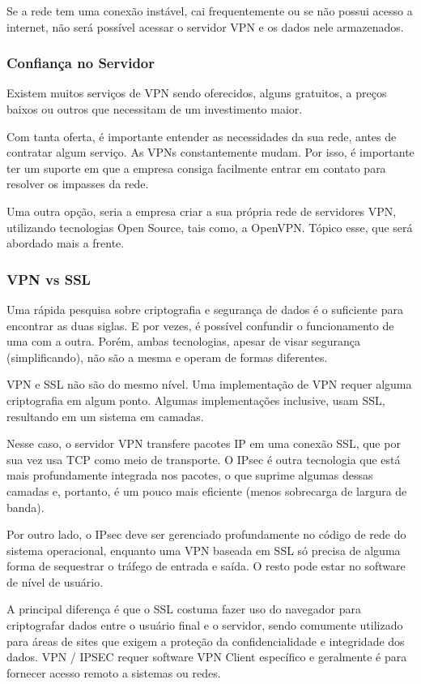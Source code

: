 \documentclass[12pt]{article}
\begin{document}
\begin{flushleft}
Se a rede tem uma conexão instável, cai frequentemente ou se não possui acesso a internet, não será possível acessar o servidor VPN e os dados nele armazenados.

\subsubsection{Confiança no Servidor}
Existem muitos serviços de VPN sendo oferecidos, alguns gratuitos, a preços baixos ou outros que necessitam de um investimento maior.

Com tanta oferta, é importante entender as necessidades da sua rede, antes de contratar algum serviço.  As VPNs constantemente mudam. Por isso, é importante ter um suporte em que a empresa consiga facilmente entrar em contato para resolver os impasses da rede.

Uma outra opção, seria a empresa criar a sua própria rede de servidores VPN, utilizando tecnologias Open Source, tais como, a OpenVPN. Tópico esse, que será abordado mais a frente.


\subsubsection{VPN vs SSL}

Uma rápida pesquisa sobre criptografia e segurança de dados é o suficiente para encontrar as duas siglas. E por vezes, é possível confundir o funcionamento de uma com a outra. Porém, ambas tecnologias, apesar de visar segurança (simplificando), não são a mesma e operam de formas diferentes.

VPN e SSL não são do mesmo nível. Uma implementação de VPN requer alguma criptografia em algum ponto. Algumas implementações inclusive, usam SSL, resultando em um sistema em camadas.

Nesse caso, o servidor  VPN transfere pacotes IP em uma conexão SSL, que por sua vez usa TCP como meio de transporte. O IPsec é outra tecnologia que está mais profundamente integrada nos pacotes, o que suprime algumas dessas camadas e, portanto, é um pouco mais eficiente (menos sobrecarga de largura de banda). 

Por outro lado, o IPsec deve ser gerenciado profundamente no código de rede do sistema operacional, enquanto uma VPN baseada em SSL só precisa de alguma forma de sequestrar o tráfego de entrada e saída. O resto pode estar no software de nível de usuário.

A principal diferença é que o SSL costuma fazer uso do navegador para criptografar dados entre o usuário final e o servidor, sendo comumente utilizado para áreas de sites que exigem a proteção da confidencialidade e integridade dos dados. VPN / IPSEC requer software VPN Client específico e geralmente é para fornecer acesso remoto a sistemas ou redes.


\end{flushleft}
\end{document}
